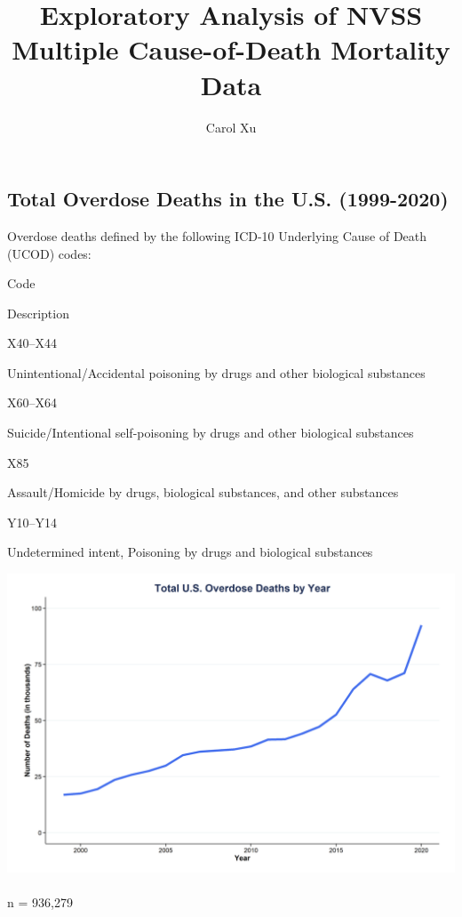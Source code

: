 \documentclass[
  letterpaper,
  DIV=11,
  numbers=noendperiod]{scrartcl}
\title{Exploratory Analysis of NVSS Multiple Cause-of-Death Mortality
Data}
\author{Carol Xu}
\date{}
\makeatletter
\let\oldparagraph\paragraph
\renewcommand{\paragraph}{
    \@ifstar
      \xxxParagraphStar
      \xxxParagraphNoStar
  }
\newcommand{\xxxParagraphStar}[1]{\oldparagraph*{#1}\mbox{}}
\newcommand{\xxxParagraphNoStar}[1]{\oldparagraph{#1}\mbox{}}
\renewcommand*\contentsname{Table of contents}
\newcommand\contentsname{Table of contents}
\makeatother
\begin{document}
\maketitle

\renewcommand*\contentsname{Table of contents}
{
\hypersetup{linkcolor=}
\setcounter{tocdepth}{2}
\tableofcontents
}

\subsection{Total Overdose Deaths in the U.S.
(1999-2020)}\label{total-overdose-deaths-in-the-u.s.-1999-2020}

Overdose deaths defined by the following ICD-10 Underlying Cause of
Death (UCOD) codes:

Code

Description

X40--X44

Unintentional/Accidental poisoning by drugs and other biological
substances

X60--X64

Suicide/Intentional self-poisoning by drugs and other biological
substances

X85

Assault/Homicide by drugs, biological substances, and other substances

Y10--Y14

Undetermined intent, Poisoning by drugs and biological substances

\includegraphics[width=0.8\linewidth,height=\textheight,keepaspectratio]{overdose_deaths_by_year.png}

\paragraph{n = 936,279}\label{n-936279}
\end{document}
